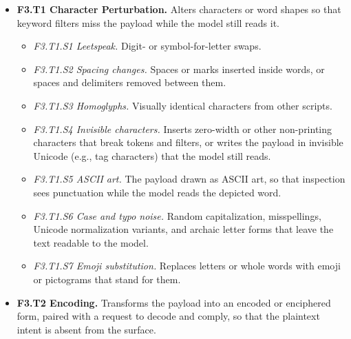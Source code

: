 \begin{itemize}[leftmargin=1.2em,itemsep=1pt,topsep=2pt]
\item \textbf{F3.T1 Character Perturbation.} Alters characters or word shapes so that keyword filters miss the payload while the model still reads it. 
\begin{itemize}[leftmargin=1.2em,itemsep=0pt,topsep=1pt,label=$\circ$]
\item \textit{F3.T1.S1 Leetspeak.} Digit- or symbol-for-letter swaps. 
\item \textit{F3.T1.S2 Spacing changes.} Spaces or marks inserted inside words, or spaces and delimiters removed between them. 
\item \textit{F3.T1.S3 Homoglyphs.} Visually identical characters from other scripts. 
\item \textit{F3.T1.S4 Invisible characters.} Inserts zero-width or other non-printing characters that break tokens and filters, or writes the payload in invisible Unicode (e.g., tag characters) that the model still reads. 
\item \textit{F3.T1.S5 ASCII art.} The payload drawn as ASCII art, so that inspection sees punctuation while the model reads the depicted word.\nolab{} 
\item \textit{F3.T1.S6 Case and typo noise.} Random capitalization, misspellings, Unicode normalization variants, and archaic letter forms that leave the text readable to the model.\nolab{} 
\item \textit{F3.T1.S7 Emoji substitution.} Replaces letters or whole words with emoji or pictograms that stand for them.\nolab{} 
\end{itemize}
\item \textbf{F3.T2 Encoding.} Transforms the payload into an encoded or enciphered form, paired with a request to decode and comply, so that the plaintext intent is absent from the surface. 

\end{itemize}
